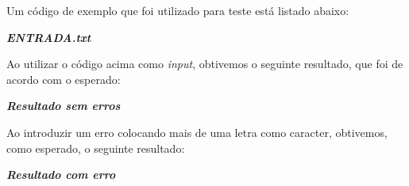 
Um código de exemplo que foi utilizado para teste está listado abaixo:

\textbf{\emph{ENTRADA.txt}}


Ao utilizar o código acima como \emph{input}, obtivemos o seguinte resultado, que foi de acordo com o esperado:

\textbf{\emph{Resultado sem erros}}


Ao introduzir um erro colocando mais de uma letra como caracter, obtivemos, como esperado, o seguinte resultado:

\textbf{\emph{Resultado com erro}}


